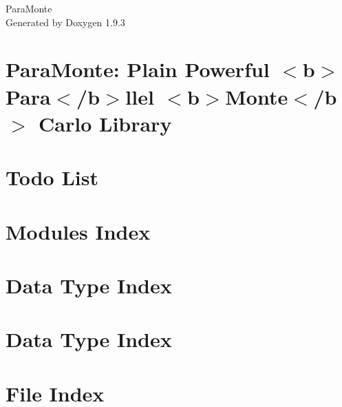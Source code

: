 \documentclass[twoside]{book}
\newcommand{\+}{\discretionary{\mbox{\scriptsize$\hookleftarrow$}}{}{}}
\newcommand{\clearemptydoublepage}{%
    \newpage{\pagestyle{empty}\cleardoublepage}%
  }
\begin{document}
  \raggedbottom
    \hypersetup{pageanchor=false,
                bookmarksnumbered=true,
                pdfencoding=unicode
               }
  \begin{titlepage}
  \vspace*{7cm}
  \begin{center}%
  {\Large Para\+Monte}\\
  \vspace*{1cm}
  {\large Generated by Doxygen 1.9.3}\\
  \end{center}
  \end{titlepage}
  \clearemptydoublepage
  \tableofcontents
  \clearemptydoublepage
  \hypersetup{pageanchor=true}
\chapter{Para\+Monte\+: Plain Powerful \texorpdfstring{$<$}{<}b\texorpdfstring{$>$}{>}Para\texorpdfstring{$<$}{<}/b\texorpdfstring{$>$}{>}llel \texorpdfstring{$<$}{<}b\texorpdfstring{$>$}{>}Monte\texorpdfstring{$<$}{<}/b\texorpdfstring{$>$}{>} Carlo Library}
\label{index}\hypertarget{index}{}
\chapter{Todo List}
\label{todo}

\chapter{Modules Index}

\chapter{Data Type Index}

\chapter{Data Type Index}

\chapter{File Index}

\end{document}
